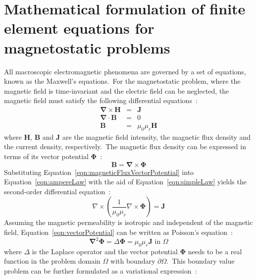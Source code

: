 \section{Mathematical formulation of finite element equations for magnetostatic problems}
\label{sec:mathematicalFormulationOfFiniteElementEquations}
All macroscopic electromagnetic phenomena are governed by a set of equations, known as the Maxwell's equations.\ For the magnetostatic problem, where the magnetic field is time-invariant and the electric field can be neglected, the magnetic field must satisfy the following differential equations~\cite{Maxwell1873}:\
\begin{eqnarray}
	\mathbf{\nabla} \times \mathbf{H} &=& \mathbf{J} \label{eqn:ampereLaw} \\
	\mathbf{\nabla} \cdot \mathbf{B} &=& 0 \label{eqn:gaussLaw} \\
	\mathbf{B} &=& \mu_{0}\mu_{r}\mathbf{H} \label{eqn:simpleLaw}
\end{eqnarray}
where $\mathbf{H}$, $\mathbf{B}$ and $\mathbf{J}$ are the magnetic field intensity, the magnetic flux density and the current density, respectively.\ The magnetic flux density can be expressed in terms of its vector potential $\mathbf{\Phi}$~\cite{Maxwell1873}:\
\begin{equation}
	\mathbf{B} = \mathbf{\nabla} \times \mathbf{\Phi}
	\label{eqn:magneticFluxVectorPotential}
\end{equation}
Substituting Equation~\ref{eqn:magneticFluxVectorPotential} into Equation~\ref{eqn:ampereLaw} with the aid of Equation~\ref{eqn:simpleLaw} yields the second-order differential equation~\cite{Maxwell1873}:\
\begin{equation}
	\nabla \times \left(\frac{1}{\mu_{0}\mu_{r}}\nabla \times \mathbf{\Phi} \right) = \mathbf{J}
	\label{eqn:vectorPotential}
\end{equation}
Assuming the magnetic permeability is isotropic and independent of the magnetic field, Equation~\ref{eqn:vectorPotential} can be written as Poisson's equation~\cite{Maxwell1873}:\
\begin{equation}
	\mathbf{\nabla}^{2} \mathbf{\Phi} = \Delta \mathbf{\Phi} = \mu_{0}\mu_{r}\mathbf{J} \text{ in } \Omega
	\label{eqn:vectorPotentialPoissonEquation}
\end{equation}
where $\Delta$ is the Laplace operator and the vector potential $\mathbf{\Phi}$ needs to be a real function in the problem domain $\Omega$ with boundary $\partial \Omega$.\ This boundary value problem can be further formulated as a variational expression~\cite{ansys2010}:\
